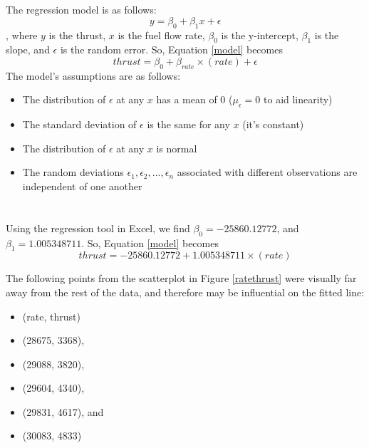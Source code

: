 \documentclass[letterpaper]{article}
\begin{document}
\section{}

The regression model is as follows:
\begin{equation}
 y = \beta_0 + \beta_1 x + \epsilon
 \label{model}
\end{equation}
, where $y$ is the thrust, $x$ is the fuel flow rate, $\beta_0$ is the y-intercept, $\beta_1$
is the slope, and $\epsilon$ is the random error.
So, Equation \ref{model} becomes
$$thrust = \beta_0 + \beta_{rate} \times (rate) + \epsilon$$
The model's assumptions are as follows:
\begin{itemize}
 \item The distribution of $\epsilon$ at any $x$ has a mean of 0 ($\mu_\epsilon=0$ to aid linearity)
 \item The standard deviation of $\epsilon$ is the same for any $x$ (it's constant)
 \item The distribution of $\epsilon$ at any $x$ is normal
 \item The random deviations $\epsilon_1, \epsilon_2, ..., \epsilon_n$ associated with different observations are independent of one another
\end{itemize}

\section{}

\subsection{}

Using the regression tool in Excel, we find $\beta_0=-25860.12772$, and
$\beta_1=1.005348711$.
So, Equation \ref{model} becomes
$$ thrust = -25860.12772 + 1.005348711 \times (rate)$$

The following points from the scatterplot in Figure \ref{ratethrust} were visually far
away from the rest of the data, and therefore may be influential on the fitted line:
\begin{itemize}
 \item[] (rate, thrust)
 \item[] (28675, 3368),
 \item[] (29088, 3820),
 \item[] (29604, 4340),
 \item[] (29831, 4617), and
 \item[] (30083, 4833)
\end{itemize}
\end{document}
